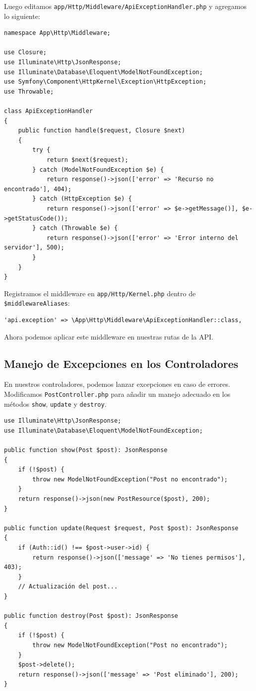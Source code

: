 \documentclass[11pt]{article}
\begin{document}
Luego editamos \texttt{app/Http/Middleware/ApiExceptionHandler.php} y
agregamos lo siguiente:

\begin{verbatim}
namespace App\Http\Middleware;

use Closure;
use Illuminate\Http\JsonResponse;
use Illuminate\Database\Eloquent\ModelNotFoundException;
use Symfony\Component\HttpKernel\Exception\HttpException;
use Throwable;

class ApiExceptionHandler
{
    public function handle($request, Closure $next)
    {
        try {
            return $next($request);
        } catch (ModelNotFoundException $e) {
            return response()->json(['error' => 'Recurso no encontrado'], 404);
        } catch (HttpException $e) {
            return response()->json(['error' => $e->getMessage()], $e->getStatusCode());
        } catch (Throwable $e) {
            return response()->json(['error' => 'Error interno del servidor'], 500);
        }
    }
}
\end{verbatim}

Registramos el middleware en \texttt{app/Http/Kernel.php} dentro de \texttt{\$middlewareAliases}:

\begin{verbatim}
'api.exception' => \App\Http\Middleware\ApiExceptionHandler::class,
\end{verbatim}

Ahora podemos aplicar este middleware en nuestras rutas de la API.

\subsection{Manejo de Excepciones en los Controladores}
\label{sec:org2cdc6e7}

En nuestros controladores, podemos lanzar excepciones en caso de
errores. Modificamos \texttt{PostController.php} para añadir un manejo
adecuado en los métodos \texttt{show}, \texttt{update} y \texttt{destroy}.

\begin{verbatim}
use Illuminate\Http\JsonResponse;
use Illuminate\Database\Eloquent\ModelNotFoundException;

public function show(Post $post): JsonResponse
{
    if (!$post) {
        throw new ModelNotFoundException("Post no encontrado");
    }
    return response()->json(new PostResource($post), 200);
}

public function update(Request $request, Post $post): JsonResponse
{
    if (Auth::id() !== $post->user->id) {
        return response()->json(['message' => 'No tienes permisos'], 403);
    }
    // Actualización del post...
}

public function destroy(Post $post): JsonResponse
{
    if (!$post) {
        throw new ModelNotFoundException("Post no encontrado");
    }
    $post->delete();
    return response()->json(['message' => 'Post eliminado'], 200);
}
\end{verbatim}
\end{document}
